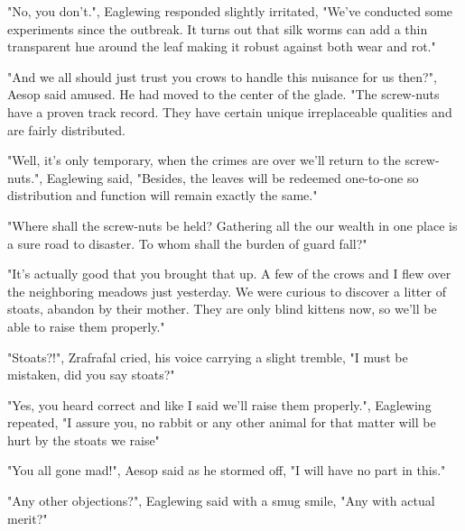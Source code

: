 \documentclass[smalldemyvopaper,11pt,twoside,onecolumn,openright,extrafontsizes]{memoir}
\begin{document}
"No, you don't.", Eaglewing responded slightly irritated, "We've conducted some experiments since the outbreak. It turns out that silk worms can add a thin transparent hue around the leaf making it robust against both wear and rot."

"And we all should just trust you crows to handle this nuisance for us then?", Aesop said amused. He had moved to the center of the glade. "The screw-nuts have a proven track record. They have certain unique irreplaceable qualities and are fairly distributed.%

"Well, it's only temporary, when the crimes are over we'll return to the screw-nuts.", Eaglewing said, "Besides, the leaves will be redeemed one-to-one so distribution and function will remain exactly the same."

"Where shall the screw-nuts be held? Gathering all the our wealth in one place is a sure road to disaster. To whom shall the burden of guard fall?"

"It's actually good that you brought that up. A few of the crows and I flew over the neighboring meadows just yesterday. We were curious to discover a litter of stoats, abandon by their mother. They are only blind kittens now, so we'll be able to raise them properly."


"Stoats?!", Zrafrafal cried, his voice carrying a slight tremble, "I must be mistaken, did you say stoats?"

"Yes, you heard correct and like I said we'll raise them properly.", Eaglewing repeated, "I assure you, no rabbit or any other animal for that matter will be hurt by the stoats we raise"

"You all gone mad!", Aesop said as he stormed off, "I will have no part in this."

"Any other objections?", Eaglewing said with a smug smile, "Any with actual merit?" 
\end{document}
